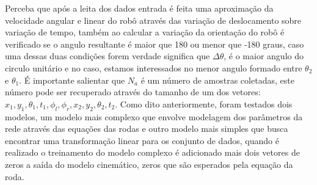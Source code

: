 Perceba que após a leita dos dados entrada é feita uma aproximação da
velocidade angular e linear do robô através das variação de deslocamento
sobre variação de tempo, também ao calcular a variação da orientação do robô
é verificado se o angulo resultante é maior que 180 ou menor que -180 graus,
caso uma dessas duas condições forem verdade significa que $\Delta \theta$,
é o maior angulo do circulo unitário e no caso, estamos interessados no menor
angulo formado entre $\theta_2$ e $\theta_1$. É importante salientar que $N_a$
é um número de amostras coletadas, este número pode ser recuperado através
do tamanho de um dos vetores: $x_1,y_1,\theta_{1},t_1,\phi_l,\phi_r,x_2,y_2,\theta_{2},t_2$.
Como dito anteriormente, foram testados dois modelos, um modelo mais complexo
que envolve modelagem dos parâmetros da rede através das equações das rodas
e outro modelo mais simples que busca encontrar uma transformação linear
para os conjunto de dados, quando é realizado o treinamento do modelo complexo
é adicionado mais dois vetores de zeros a saída do modelo cinemático, zeros
que são esperados pela equação da roda. 